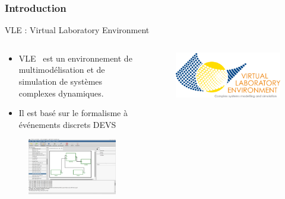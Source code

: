 \documentclass[xetex, compress, table, dvipsnames]{beamer}
\begin{document}
\begin{frame}
  \frametitle{Introduction}
  \begin{block}{VLE : Virtual Laboratory Environment}
    \begin{columns}
      \begin{column}{.47\textwidth}
        \begin{itemize}
        \item VLE~\cite{quesnel09} est un environnement de
          multimodélisation et de simulation de systèmes complexes
          dynamiques.
        \item Il est basé sur le formalisme à événements discrets
          \alert{DEVS}~\cite{zeigler00}
        \end{itemize}
        \begin{figure}
          \centering
          \includegraphics[width=.8\textwidth]{gvle}
        \end{figure}
      \end{column}
      \begin{column}{.47\textwidth}
        \begin{figure}
          \centering
          \includegraphics[width=.8\textwidth]{yellowvle}
        \end{figure}


\end{column}
\end{columns}
\end{block}
\end{frame}
\end{document}
